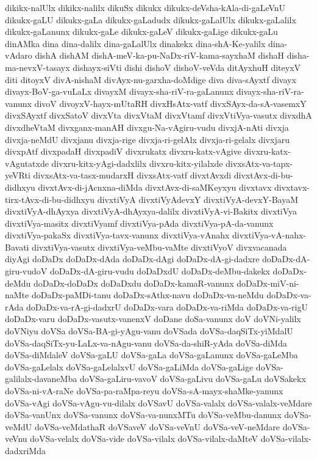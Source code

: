 {dikikx-nalUlx
dikikx-nalilx
dikuSx
dikukx
dikukx-deVsha-kAla-di-gaLeVnU
dikukx-gaLU
dikukx-gaLa
dikukx-gaLadudx
dikukx-gaLalUlx
dikukx-gaLalilx
dikukx-gaLanunx
dikukx-gaLe
dikukx-gaLeV
dikukx-gaLige
dikukx-gaLu
dinAMka
dina
dina-dalilx
dina-gaLalUlx
dinakekx
dina-shA-Ke-yalilx
dina-vAdaro
dishA
dishAM
dishA-meV-ka-pu-NaDx-riV-kama-sayxhaM
dishaH
disha-ma-nevxV-tasayx
dishayx-siVti
dishi
dishoV
dishoV-veVda
ditAyxhuH
diteyxV
diti
ditoyxV
divA-nishaM
divAyx-nu-garxha-doMdige
diva
diva-sAyxtf
divayx
divayx-BoV-ga-vuLaLx
divayxM
divayx-sha-riV-ra-gaLanunx
divayx-sha-riV-ra-vanunx
divoV
divoyxV-hayx-mUtaRH
divxHsAtx-vatf
divxSAyx-da-sA-vasemxY
divxSAyxtf
divxSatoV
divxVta
divxVtaM
divxVtamf
divxVtiVya-vasutx
divxdhA
divxdheVtaM
divxganx-manAH
divxgu-Na-vAgiru-vudu
divxjA-nAti
divxja
divxja-neMdU
divxjanu
divxja-rige
divxja-ri-gelAlx
divxja-ri-gelalx
divxjaru
divxpAtf
divxpadaH
divxpadiV
divxrukatx
divxru-katx-vAgive
divxru-katx-vAgutatxde
divxru-kitx-yAgi-dadxlilx
divxru-kitx-yilalxde
divxsAtx-va-tapx-yeVRti
divxsAtx-va-tasx-mudarxH
divxsAtx-vatf
divxtAvxdi
divxtAvx-di-bu-didhxyu
divxtAvx-di-jAcnxna-diMda
divxtAvx-di-saMKeyxyu
divxtavx
divxtavx-tirx-tAvx-di-bu-didhxyu
divxtiVyA
divxtiVyAdevxY
divxtiVyA-devxY-BayaM
divxtiVyA-dhAyxya
divxtiVyA-dhAyxya-dalilx
divxtiVyA-vi-Bakitx
divxtiVya
divxtiVya-masitx
divxtiVyamf
divxtiVya-pAda
divxtiVya-pA-da-vanunx
divxtiVya-pakaSx
divxtiVya-tavx-vanunx
divxtiVya-vAnahx
divxtiVya-vA-nahx-Bavati
divxtiVya-vasutx
divxtiVya-veMbu-vaMte
divxtiVyoV
divxvacanada
diyAgi
doDaDx
doDaDx-dAda
doDaDx-dAgi
doDaDx-dA-gi-dadxre
doDaDx-dA-giru-vudoV
doDaDx-dA-giru-vudu
doDaDxdU
doDaDx-deMbu-dakekx
doDaDx-deMdu
doDaDx-doDaDx
doDaDxdu
doDaDx-kamaR-vanunx
doDaDx-miV-ni-naMte
doDaDx-paMDi-tanu
doDaDx-sAthx-navu
doDaDx-va-neMdu
doDaDx-va-rAda
doDaDx-va-rA-gi-dadxrU
doDaDx-vara
doDaDx-va-riMda
doDaDx-va-rigU
doDaDx-varu
doDaDx-vasutx-vanenxV
doDane
doSa-vanunx
doV
doVNi-yalilx
doVNiyu
doVSa
doVSa-BA-gi-yAgu-vanu
doVSada
doVSa-daqSiTx-yiMdalU
doVSa-daqSiTx-yu-LaLx-va-nAgu-vanu
doVSa-da-shiR-yAda
doVSa-diMda
doVSa-diMdaleV
doVSa-gaLU
doVSa-gaLa
doVSa-gaLanunx
doVSa-gaLeMba
doVSa-gaLelalx
doVSa-gaLelalxvU
doVSa-gaLiMda
doVSa-gaLige
doVSa-galilalx-davaneMba
doVSa-gaLiru-vavoV
doVSa-gaLivu
doVSa-gaLu
doVSakekx
doVSa-ni-vA-raNe
doVSa-pa-raMpa-reyu
doVSa-sA-mayx-shaMke-yanunx
doVSa-vAgi
doVSa-vAgu-vu-dilalx
doVSavU
doVSa-valalx
doVSa-valalx-veMdare
doVSa-vanUnx
doVSa-vanunx
doVSa-va-nunxMTu
doVSa-veMbu-danunx
doVSa-veMdU
doVSa-veMdathaR
doVSaveV
doVSa-veVnU
doVSa-veV-neMdare
doVSa-veVnu
doVSa-velalx
doVSa-vide
doVSa-vilalx
doVSa-vilalx-daMteV
doVSa-vilalx-dadxriMda
}
